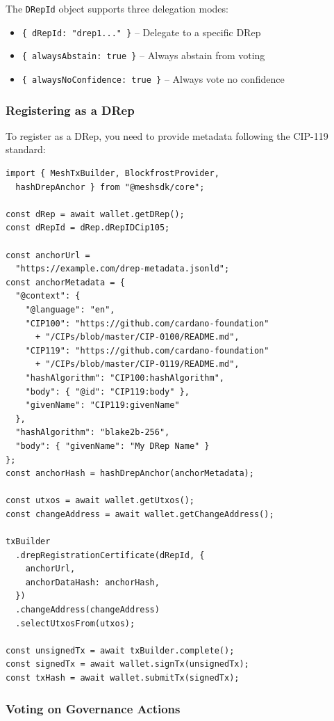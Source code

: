 The \texttt{DRepId} object supports three delegation modes:
\begin{itemize}
    \item \texttt{\{ dRepId: "drep1..." \}} -- Delegate to a specific DRep
    \item \texttt{\{ alwaysAbstain: true \}} -- Always abstain from voting
    \item \texttt{\{ alwaysNoConfidence: true \}} -- Always vote no confidence
\end{itemize}

\subsubsection{Registering as a DRep}

To register as a DRep, you need to provide metadata following the CIP-119 standard:

\begin{lstlisting}[caption=Registering as a DRep with Metadata]
import { MeshTxBuilder, BlockfrostProvider,
  hashDrepAnchor } from "@meshsdk/core";

const dRep = await wallet.getDRep();
const dRepId = dRep.dRepIDCip105;

const anchorUrl =
  "https://example.com/drep-metadata.jsonld";
const anchorMetadata = {
  "@context": {
    "@language": "en",
    "CIP100": "https://github.com/cardano-foundation"
      + "/CIPs/blob/master/CIP-0100/README.md",
    "CIP119": "https://github.com/cardano-foundation"
      + "/CIPs/blob/master/CIP-0119/README.md",
    "hashAlgorithm": "CIP100:hashAlgorithm",
    "body": { "@id": "CIP119:body" },
    "givenName": "CIP119:givenName"
  },
  "hashAlgorithm": "blake2b-256",
  "body": { "givenName": "My DRep Name" }
};
const anchorHash = hashDrepAnchor(anchorMetadata);

const utxos = await wallet.getUtxos();
const changeAddress = await wallet.getChangeAddress();

txBuilder
  .drepRegistrationCertificate(dRepId, {
    anchorUrl,
    anchorDataHash: anchorHash,
  })
  .changeAddress(changeAddress)
  .selectUtxosFrom(utxos);

const unsignedTx = await txBuilder.complete();
const signedTx = await wallet.signTx(unsignedTx);
const txHash = await wallet.submitTx(signedTx);
\end{lstlisting}

\subsubsection{Voting on Governance Actions}

